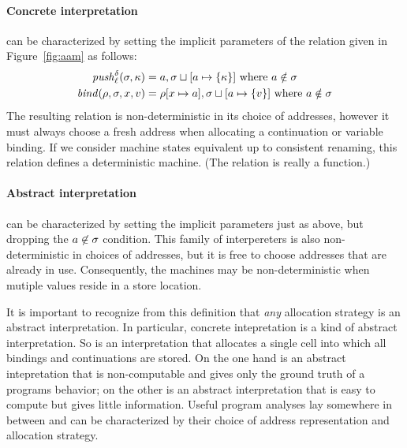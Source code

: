 \documentclass[preprint,onecolumn,9pt]{sigplanconf} %
\begin{document}
\paragraph{Concrete interpretation} can be characterized by setting the implicit
parameters of the relation given in Figure~\ref{fig:aam} as follows:
\begin{align*}
\mathit{push}_{\ell}^{\delta}(\sigma,\kappa) &= a,\sigma\sqcup[a\mapsto\{\kappa\}]
\mbox{ where }a \notin\sigma
\\
\mathit{bind}(\rho,\sigma,x,v) &= \rho[x\mapsto a],\sigma\sqcup[a\mapsto\{v\}]
\mbox{ where }a \notin\sigma
\end{align*}
The resulting relation is non-deterministic in its choice of
addresses, however it must always choose a fresh address when
allocating a continuation or variable binding.  If we consider machine
states equivalent up to consistent renaming, this relation defines
a deterministic machine.  (The relation is really a function.)


\paragraph{Abstract interpretation} can be characterized by setting the implicit
parameters just as above, but dropping the $a \not\in \sigma$
condition.  This family of interpereters is also non-deterministic in
choices of addresses, but it is free to choose addresses that are
already in use.  Consequently, the machines may be non-deterministic
when mutiple values reside in a store location.

It is important to recognize from this definition that \emph{any}
allocation strategy is an abstract interpretation.  In particular,
concrete intepretation is a kind of abstract interpretation.  So is an
interpretation that allocates a single cell into which all bindings
and continuations are stored.  On the one hand is an abstract
intepretation that is non-computable and gives only the ground truth
of a programs behavior; on the other is an abstract interpretation
that is easy to compute but gives little information.  Useful program
analyses lay somewhere in between and can be characterized by their
choice of address representation and allocation strategy.

\end{document}
